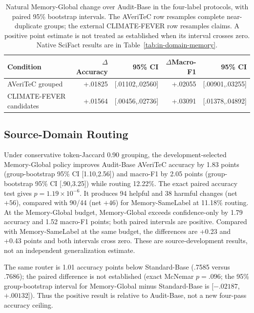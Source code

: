\documentclass[runningheads]{llncs}
\begin{document}
\begin{table}[t]
\caption{Natural Memory-Global change over Audit-Base in the four-label protocols,
with paired 95\% bootstrap intervals. The AVeriTeC row resamples complete
near-duplicate groups; the external CLIMATE-FEVER row resamples claims.
A positive point estimate is not treated as established when its interval
crosses zero. Native SciFact results are in Table~\ref{tab:in-domain-memory}.}
\label{tab:delta-ci}
\centering\small
\begin{tabular}{lrrrr}
\toprule
Condition & $\Delta$Accuracy & 95\% CI & $\Delta$Macro-F1 & 95\% CI \\
\midrule
AVeriTeC grouped & +.01825 & [.01102,.02560] & +.02055 & [.00901,.03255] \\
CLIMATE-FEVER candidates & +.01564 & [.00456,.02736] & +.03091 & [.01378,.04892] \\
\bottomrule
\end{tabular}
\end{table}

\subsection{Source-Domain Routing}

Under conservative token-Jaccard 0.90 grouping, the development-selected
Memory-Global policy improves Audit-Base AVeriTeC accuracy by 1.83 points
(group-bootstrap 95\% CI [1.10,2.56]) and macro-F1 by 2.05 points
(group-bootstrap 95\% CI [.90,3.25]) while routing 12.22\%.
The exact paired accuracy test gives $p=1.19\times10^{-6}$. It produces 94 helpful and 38 harmful changes
(net $+56$), compared with 90/44 (net $+46$) for Memory-SameLabel at 11.18\%
routing. At the Memory-Global budget, Memory-Global exceeds confidence-only by 1.79 accuracy and
1.52 macro-F1 points; both paired intervals are positive. Compared with
Memory-SameLabel at the same budget, the differences are +0.23 and +0.43 points and
both intervals cross zero. These are source-development results, not an
independent generalization estimate.

The same router is 1.01 accuracy points below Standard-Base (.7585 versus
.7686); the paired difference is not established (exact McNemar $p=.096$;
the 95\% group-bootstrap interval for Memory-Global minus Standard-Base is
[$-.02187$,$+.00132$]). Thus the positive result is relative to Audit-Base,
not a new four-pass accuracy ceiling.
\end{document}
